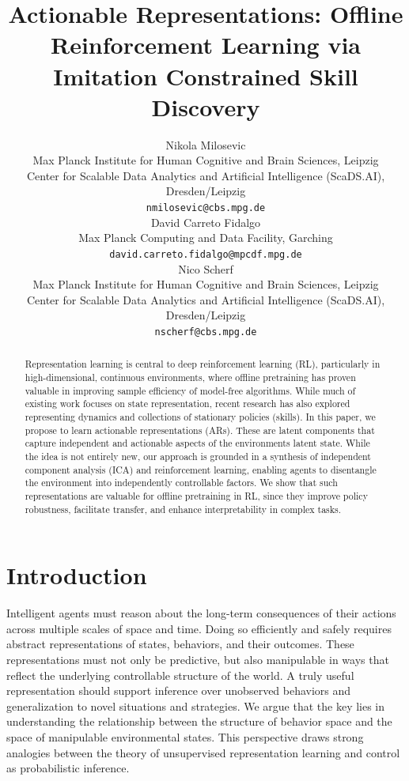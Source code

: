 \documentclass{article}
\title{Actionable Representations: Offline Reinforcement Learning via Imitation Constrained Skill Discovery}
\author{Nikola Milosevic \\
Max Planck Institute for Human Cognitive and Brain Sciences, Leipzig\\
Center for Scalable Data Analytics and Artificial Intelligence (ScaDS.AI), Dresden/Leipzig\\
\texttt{nmilosevic@cbs.mpg.de} \\
\And
David Carreto Fidalgo \\
Max Planck Computing and Data Facility, Garching\\
\texttt{david.carreto.fidalgo@mpcdf.mpg.de} \\
\And
Nico Scherf \\
Max Planck Institute for Human Cognitive and Brain Sciences, Leipzig\\
Center for Scalable Data Analytics and Artificial Intelligence (ScaDS.AI), Dresden/Leipzig\\
\texttt{nscherf@cbs.mpg.de} \\
}
\theoremstyle{plain}
\theoremstyle{definition}
\theoremstyle{remark}
\begin{document}
\maketitle

\begin{abstract}
Representation learning is central to deep reinforcement learning (RL), particularly in high-dimensional, continuous environments, where offline pretraining has proven valuable in improving sample efficiency of model-free algorithms. 
While much of existing work focuses on state representation, recent research has also explored representing dynamics and collections of stationary policies (skills).
In this paper, we propose to learn actionable representations (ARs). 
These are latent components that capture independent and actionable aspects of the environments latent state. 
While the idea is not entirely new, our approach is grounded in a synthesis of independent component analysis (ICA) and reinforcement learning, enabling agents to disentangle the environment into independently controllable factors. 
We show that such representations are valuable for offline pretraining in RL, since they improve policy robustness, facilitate transfer, and enhance interpretability in complex tasks.
\end{abstract}


\section{Introduction} 

Intelligent agents must reason about the long-term consequences of their actions across multiple scales of space and time. Doing so efficiently and safely requires abstract representations of states, behaviors, and their outcomes. These representations must not only be predictive, but also manipulable in ways that reflect the underlying controllable structure of the world. A truly useful representation should support inference over unobserved behaviors and generalization to novel situations and strategies.
We argue that the key lies in understanding the relationship between the structure of behavior space and the space of manipulable environmental states. %
This perspective draws strong analogies between the theory of unsupervised representation learning and control as probabilistic inference.
\end{document}
